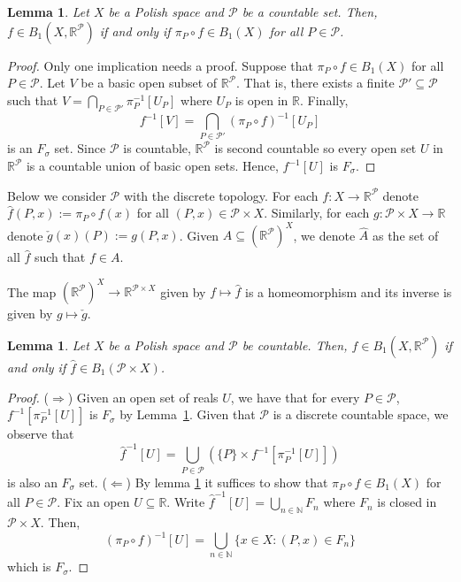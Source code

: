 \documentclass[psamsfonts]{amsart}
\newtheorem{lem}[thm]{Lemma}
\theoremstyle{definition}
\theoremstyle{remark}
\numberwithin{equation}{section}
\begin{document}
\begin{lem}\label{baire 1 and projections}
    Let $X$ be a Polish space and $\mathcal{P}$ be a countable set. Then, $f\in B_1(X,\mathbb{R}^\mathcal{P})$ if and only if $\pi_P\circ f\in B_1(X)$ for all $P\in\mathcal{P}$.
\end{lem}

\begin{proof}
    Only one implication needs a proof. Suppose that $\pi_P\circ f\in B_1(X)$ for all $P\in\mathcal{P}$. Let $V$ be a basic open subset of $\mathbb{R}^\mathcal{P}$. That is, there exists a finite $\mathcal{P}'\subseteq\mathcal{P}$ such that $V=\bigcap_{P\in\mathcal{P}'}\pi_P^{-1}[U_P]$ where $U_P$ is open in $\mathbb{R}$. Finally, 
    $$f^{-1}[V]=\bigcap_{P\in\mathcal{P}'}(\pi_P\circ f)^{-1}[U_P]$$ is an $F_\sigma$ set. Since $\mathcal{P}$ is countable, $\mathbb{R}^\mathcal{P}$ is second countable so every open set $U$ in $\mathbb{R}^\mathcal{P}$ is a countable union of basic open sets. Hence, $f^{-1}[U]$ is $F_\sigma$.
\end{proof}

Below we consider $\mathcal P$ with the discrete topology. For each $f:X\rightarrow\mathbb{R}^\mathcal{P}$ denote $\hat f(P,x):=\pi_P\circ f(x)$ for all $(P,x)\in\mathcal{P}\times X$. Similarly, for each $g:\mathcal{P}\times X\rightarrow\mathbb{R}$ denote $\check g(x)(P):=g(P,x)$. Given $A\subseteq (\mathbb{R}^\mathcal{P})^X$, we denote $\hat A$ as the set of all $\hat f$ such that $f\in A$.

The map $\left(\mathbb R^\mathcal P\right)^X\to\mathbb R^{\mathcal P\times X}$ given by $f\mapsto\hat f$ is a homeomorphism and its inverse is given by $g\mapsto\check g$.

\begin{lem}\label{homeo}
    Let $X$ be a Polish space and $\mathcal{P}$ be countable. Then, $f\in B_1(X,\mathbb R^\mathcal P)$ if and only if $\hat f\in B_1(\mathcal P\times X)$.
\end{lem}

\begin{proof}
    ($\Rightarrow$) Given an open set of reals $U$, we have that for every $P\in\mathcal P$, $f^{-1}[\pi_P^{-1}[U]]$ is $F_\sigma$ by Lemma~\ref{baire 1 and projections}. Given that $\mathcal P$ is a discrete countable space, we observe that
    $$\hat f^{-1}[U]=\bigcup_{P\in\mathcal P}\left(\{P\}\times f^{-1}[\pi_P^{-1}[U]]\right)
    $$ is also an $F_\sigma$ set.
    ($\Leftarrow$) By lemma \ref{baire 1 and projections} it suffices to show that $\pi_P\circ f\in B_1(X)$ for all $P\in\mathcal{P}$. Fix an open $U\subseteq\mathbb{R}$. Write $\hat{f}^{-1}[U]=\bigcup_{n\in\mathbb{N}}F_n$ where $F_n$ is closed in $\mathcal{P}\times X$. Then,
    $$(\pi_P\circ f)^{-1}[U]=\bigcup_{n\in\mathbb{N}}\{x\in X:(P,x)\in F_n\}$$
    which is $F_\sigma$.
\end{proof}
\end{document}
